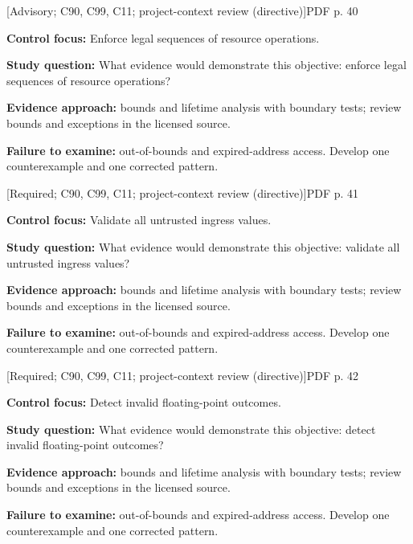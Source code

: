 \documentclass[10pt,letterpaper]{article}
\begin{document}
 \textsf{\footnotesize [Advisory; C90, C99, C11; project-context review (directive)]}\hfill{\footnotesize PDF p. 40}\par
\textbf{Control focus:} Enforce legal sequences of resource operations.\par
\textbf{Study question:} What evidence would demonstrate this objective: enforce legal sequences of resource operations?\par
\textbf{Evidence approach:} bounds and lifetime analysis with boundary tests; review bounds and exceptions in the licensed source.\par
\textbf{Failure to examine:} out-of-bounds and expired-address access. Develop one counterexample and one corrected pattern.\par
\smallskip
{}
 \textsf{\footnotesize [Required; C90, C99, C11; project-context review (directive)]}\hfill{\footnotesize PDF p. 41}\par
\textbf{Control focus:} Validate all untrusted ingress values.\par
\textbf{Study question:} What evidence would demonstrate this objective: validate all untrusted ingress values?\par
\textbf{Evidence approach:} bounds and lifetime analysis with boundary tests; review bounds and exceptions in the licensed source.\par
\textbf{Failure to examine:} out-of-bounds and expired-address access. Develop one counterexample and one corrected pattern.\par
\smallskip
{}
 \textsf{\footnotesize [Required; C90, C99, C11; project-context review (directive)]}\hfill{\footnotesize PDF p. 42}\par
\textbf{Control focus:} Detect invalid floating-point outcomes.\par
\textbf{Study question:} What evidence would demonstrate this objective: detect invalid floating-point outcomes?\par
\textbf{Evidence approach:} bounds and lifetime analysis with boundary tests; review bounds and exceptions in the licensed source.\par
\textbf{Failure to examine:} out-of-bounds and expired-address access. Develop one counterexample and one corrected pattern.\par
\smallskip
\end{document}
